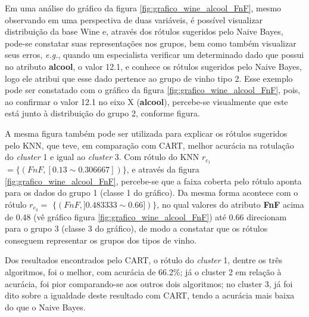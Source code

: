 Em uma análise do gráfico da figura \ref{fig:grafico_wine_alcool_FnF}, mesmo observando em uma perspectiva de duas variáveis, é possível visualizar distribuição da base Wine  e, através dos rótulos sugeridos pelo Naive Bayes, pode-se constatar suas representações nos grupos, bem como também visualizar seus erros, \textit{e.g.}, quando um especialista verificar um determinado dado que possui no atributo \textbf{alcool}, o valor 12.1, e conhece os rótulos sugeridos pelo Naive Bayes, logo ele atribui que esse dado pertence ao grupo de vinho tipo 2. Esse exemplo pode ser constatado com o gráfico da figura \ref{fig:grafico_wine_alcool_FnF}, pois, ao confirmar o valor 12.1 no eixo X (\textbf{alcool}), percebe-se visualmente que este está junto à distribuição do grupo 2, conforme figura. 

A mesma figura também pode ser utilizada para explicar os rótulos sugeridos pelo KNN, que teve, em comparação com CART, melhor acurácia na rotulação do \textit{cluster} 1 e igual ao \textit{cluster} 3. Com rótulo do KNN ${r_{c_1}}$ $=\{(FnF, [ 0.13 \sim  0.306667  ] ) \} $, e através da figura \ref{fig:grafico_wine_alcool_FnF}, percebe-se que a faixa coberta pelo rótulo aponta para os dados do grupo 1 (classe 1 do gráfico). Da mesma forma acontece com o rótulo ${r_{c_3}=}$ ${\{ (FnF, ] 0.483333 \sim  0.66 ])\} }$, no qual valores do atributo \textbf{FnF} acima de 0.48 (vê gráfico figura \ref{fig:grafico_wine_alcool_FnF}) até 0.66 direcionam para o grupo 3 (classe 3 do gráfico), de modo a constatar que os rótulos conseguem representar os grupos dos tipos de vinho.


Dos resultados encontrados pelo CART, o rótulo do \textit{cluster} 1, dentre os três algoritmos, foi o melhor, com acurácia de 66.2\%; já o cluster 2 em relação à acurácia, foi pior comparando-se aos outros dois algoritmos; no cluster 3, já foi dito sobre a igualdade deste resultado com CART, tendo a acurácia mais baixa do que o Naive Bayes. 

